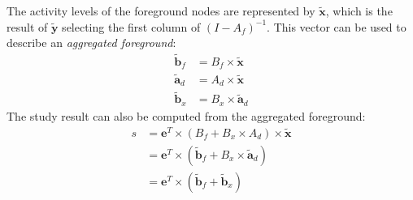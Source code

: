 The activity levels of the foreground nodes are represented by $\tilde{\mathbf{x}}$, which is the result of $\tilde{\mathbf{y}}$ selecting the first column of $(I-A_f)^{-1}$.
This vector can be used to describe an \emph{aggregated foreground}:
\begin{equation}
\begin{array}{rl}
    \tilde{\mathbf{b}}_f & = B_f \times \tilde{\mathbf{x}} \\
    \tilde{\mathbf{a}}_d & = A_d \times \tilde{\mathbf{x}} \\
    \tilde{\mathbf{b}}_x & = B_x \times \tilde{\mathbf{a}}_d
\end{array}
\label{eqn:agg}
\end{equation}
The study result can also be computed from the aggregated foreground:
\begin{equation}
\begin{array}{rl}
s & = \mathbf{e}^T \times( B_f + B_x \times A_d) \times \tilde{\mathbf{x}} \\
  & = \mathbf{e}^T \times( \tilde{\mathbf{b}}_f + B_x \times\tilde{\mathbf{a}}_d) \\
  & = \mathbf{e}^T \times( \tilde{\mathbf{b}}_f + \tilde{\mathbf{b}}_x) \\
\end{array}
\end{equation}
